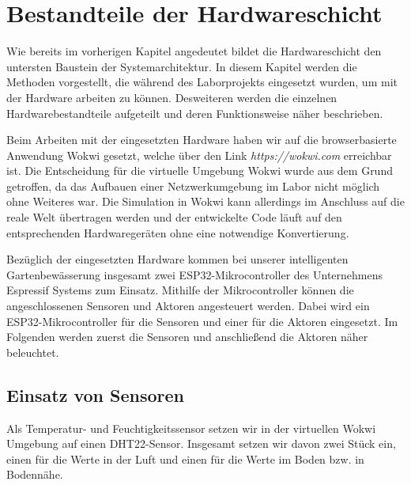 
\section{Bestandteile der Hardwareschicht}

Wie bereits im vorherigen Kapitel angedeutet bildet die Hardwareschicht den untersten Baustein der Systemarchitektur. In diesem Kapitel werden die Methoden vorgestellt, die während des Laborprojekts eingesetzt wurden, um mit der Hardware arbeiten zu können. Desweiteren werden die einzelnen Hardwarebestandteile aufgeteilt und deren Funktionsweise näher beschrieben.

Beim Arbeiten mit der eingesetzten Hardware haben wir auf die browserbasierte Anwendung Wokwi gesetzt, welche über den Link \textit{https://wokwi.com} erreichbar ist. Die Entscheidung für die virtuelle Umgebung Wokwi wurde aus dem Grund getroffen, da das Aufbauen einer Netzwerkumgebung im Labor nicht möglich ohne Weiteres war. Die Simulation in Wokwi kann allerdings im Anschluss auf die reale Welt übertragen werden und der entwickelte Code läuft auf den entsprechenden Hardwaregeräten ohne eine notwendige Konvertierung.

Bezüglich der eingesetzten Hardware kommen bei unserer intelligenten Gartenbewässerung insgesamt zwei ESP32-Mikrocontroller des Unternehmens Espressif Systems zum Einsatz. Mithilfe der Mikrocontroller können die angeschlossenen Sensoren und Aktoren angesteuert werden. Dabei wird ein ESP32-Mikrocontroller für die Sensoren und einer für die Aktoren eingesetzt. Im Folgenden werden zuerst die Sensoren und anschließend die Aktoren näher beleuchtet.

\subsection{Einsatz von Sensoren}
Als Temperatur- und Feuchtigkeitssensor setzen wir in der virtuellen Wokwi Umgebung auf einen DHT22-Sensor. Insgesamt setzen wir davon zwei Stück ein, einen für die Werte in der Luft und einen für die Werte im Boden bzw. in Bodennähe.


